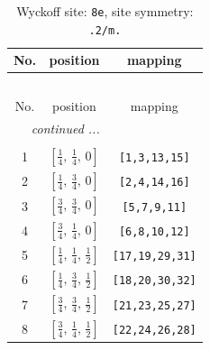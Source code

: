 \documentclass[fleqn,8pt]{jsarticle}
\begin{document}
\begin{longtable}{ccc}
\caption{Wyckoff site: {\tt 8e}, site symmetry: {\tt .2/m.}}
 \\
 \hline \hline
No. & position & mapping \\ \hline \endfirsthead

\multicolumn{2}{l}{\tablename\ \thetable{}} \\
 \hline \hline
No. & position & mapping \\ \hline \endhead

 \hline \hline
\multicolumn{2}{r}{\footnotesize\it continued ...} \\ \endfoot

 \hline \hline
\multicolumn{2}{r}{} \\ \endlastfoot

1 & $\left[ \frac{1}{4},\, \frac{1}{4},\, 0 \right]$ & {\tt [1,3,13,15]} \\ \hline
2 & $\left[ \frac{1}{4},\, \frac{3}{4},\, 0 \right]$ & {\tt [2,4,14,16]} \\ \hline
3 & $\left[ \frac{3}{4},\, \frac{3}{4},\, 0 \right]$ & {\tt [5,7,9,11]} \\ \hline
4 & $\left[ \frac{3}{4},\, \frac{1}{4},\, 0 \right]$ & {\tt [6,8,10,12]} \\ \hline
5 & $\left[ \frac{1}{4},\, \frac{1}{4},\, \frac{1}{2} \right]$ & {\tt [17,19,29,31]} \\ \hline
6 & $\left[ \frac{1}{4},\, \frac{3}{4},\, \frac{1}{2} \right]$ & {\tt [18,20,30,32]} \\ \hline
7 & $\left[ \frac{3}{4},\, \frac{3}{4},\, \frac{1}{2} \right]$ & {\tt [21,23,25,27]} \\ \hline
8 & $\left[ \frac{3}{4},\, \frac{1}{4},\, \frac{1}{2} \right]$ & {\tt [22,24,26,28]} \\
\end{longtable}
\renewcommand{\arraystretch}{1.2}
\end{document}
